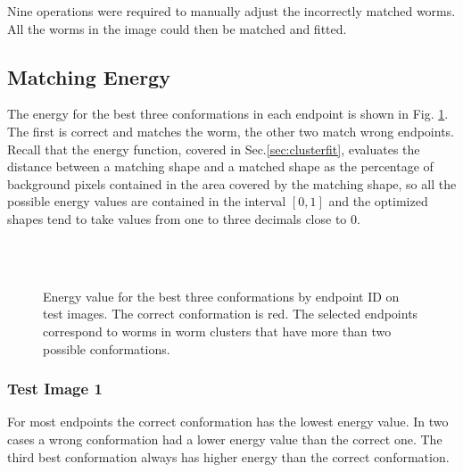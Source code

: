 Nine operations were required to manually adjust the incorrectly matched worms.
All the worms in the image could then be matched and fitted.

\subsection{Matching Energy}

The energy for the best three conformations in each endpoint is shown in Fig. \ref{fig:energy123}.
The first is correct and matches the worm, the other two match wrong endpoints.\\
Recall that the energy function, covered
in Sec.\ref{sec:clusterfit}, evaluates the distance between a matching shape
and a matched shape as the percentage of background pixels contained in the 
area covered by the matching shape, so all the possible energy values are
contained in the interval $[0,1]$ and the optimized shapes tend to take values
from one to three decimals close to $0$.

\captionsetup[subfloat]{farskip=-0.8cm,captionskip=-0.2cm}

\begin{figure}[htp]
  \begin{center}
    \\
    \\
  \end{center}
  \caption[Energy value for the best three conformations by endpoint ID on test
images]{Energy value for the best three conformations by endpoint ID on test
images. The correct conformation is red. The selected endpoints correspond to worms in worm clusters that
have more than two possible conformations.}
  \label{fig:energy123}
\end{figure}

\subsubsection*{Test Image 1}

For most endpoints the correct conformation has the lowest energy value.
In two cases a wrong conformation had a lower energy value than the correct
one. The third best conformation always has higher energy than the correct conformation.\\

